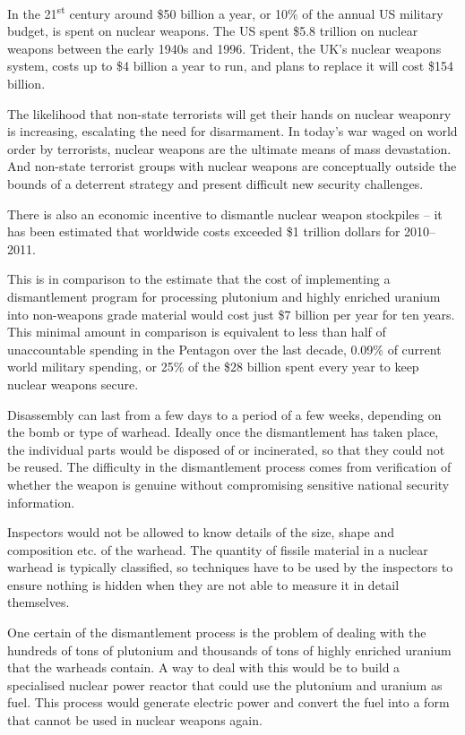 \documentclass[twoside,titlepage,11pt,twocolumn,a4paper]{article}
\begin{document}
In the 21\textsuperscript{st} century around \$50 billion a year, or 10\%
of the annual US military budget, is spent on nuclear weapons. \citep{USspending} The
US spent \$5.8 trillion on nuclear weapons between the early 1940s and
1996. Trident, the UK's nuclear weapons system, costs up to \$4
billion a year to run, and plans to replace it will cost \$154
billion.  

The likelihood that non-state terrorists will get their
hands on nuclear weaponry is increasing, escalating the need for
disarmament. In today's war waged on world order by terrorists,
nuclear weapons are the ultimate means of mass devastation. And
non-state terrorist groups with nuclear weapons are conceptually
outside the bounds of a deterrent strategy and present difficult new
security challenges.  

There is also an economic incentive to dismantle
nuclear weapon stockpiles -- it has been estimated that worldwide
costs exceeded \$1 trillion dollars for 2010--2011. \citep{worldSpending} 

This is in comparison to the estimate that the cost of implementing a
dismantlement program for processing plutonium and highly enriched
uranium into non-weapons grade material would cost just \$7 billion
per year for ten years. \citep{worldSafe} This minimal amount in comparison is
equivalent to less than half of unaccountable spending in the Pentagon
over the last decade, 0.09\% of current world military spending, or
25\% of the \$28 billion spent every year to keep nuclear weapons
secure. 

Disassembly can last from a few days to a period of a few
weeks, depending on the bomb or type of warhead. \citep{kopte1996} Ideally once the
dismantlement has taken place, the individual parts would be disposed
of or incinerated, so that they could not be reused. The difficulty in
the dismantlement process comes from verification of whether the
weapon is genuine without compromising sensitive national security
information. 

Inspectors would not be allowed to know details of the
size, shape and composition etc. of the warhead. The quantity of
fissile material in a nuclear warhead is typically classified, so
techniques have to be used by the inspectors to ensure nothing is
hidden when they are not able to measure it in detail themselves.  

One certain of the dismantlement process is the problem of dealing with
the hundreds of tons of plutonium and thousands of tons of highly
enriched uranium that the warheads contain. A way to deal with this
would be to build a specialised nuclear power reactor that could use
the plutonium and uranium as fuel. This process would generate
electric power and convert the fuel into a form that cannot be used in
nuclear weapons again. \citep{moxFuel, feiveson2011, nature2009}
\end{document}
